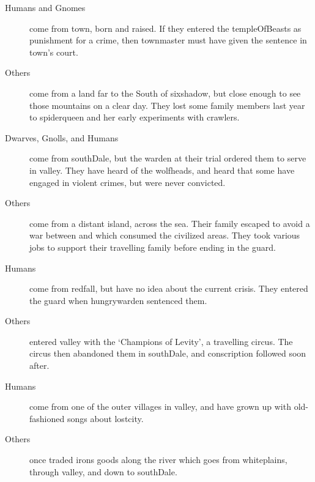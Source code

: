\begin{multicols}{2}
\begin{dlist}
  \item
  \begin{description}
    \item[Humans and Gnomes]
  come from \gls{town}, born and raised.
  If they entered the \gls{templeOfBeasts} as punishment for a crime, then \gls{townmaster} must have given the sentence in \gls{town}'s \gls{court}.
    \item[Others]
    come from a land far to the South of \gls{sixshadow}, but close enough to see those mountains on a clear day.
    They lost some family members last year to \gls{spiderqueen} and her early experiments with \glspl{crawler}.
  \end{description}
  \item
  \begin{description}
    \item[Dwarves, Gnolls, and Humans]
    come from \gls{southDale}, but the \gls{warden} at their trial ordered them to serve in \gls{valley}.
    They have heard of the \glspl{wolfhead}, and heard that some have engaged in violent crimes, but were never convicted.
    \item[Others]
    come from a distant island, across the sea.
    Their family escaped to avoid a war between  and  which consumed the civilized areas.
    They took various jobs to support their travelling family before ending in the \gls{guard}.
  \end{description}
  \item
  \begin{description}
    \item[Humans]
    come from \gls{redfall}, but have no idea about the current crisis.
    They entered the \gls{guard} when \gls{hungrywarden} sentenced them.
    \item[Others]
    entered \gls{valley} with the `Champions of Levity', a travelling circus.
    The circus then abandoned them in \gls{southDale}, and conscription followed soon after.
  \end{description}
  \item
  \begin{description}
    \item[Humans]
    come from one of the outer \glspl{village} in \gls{valley}, and have grown up with old-fashioned songs about \gls{lostcity}.
    \item[Others]
    once traded irons goods along the river which goes from \gls{whiteplains}, through \gls{valley}, and down to \gls{southDale}.

\end{description}
\end{dlist}
\end{multicols}

